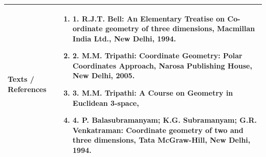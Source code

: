 \documentclass[11pt,a4paper]{article}
\begin{document}
\vspace{8pt}
\renewcommand{\arraystretch}{1.3}
\begin{tabularx}{\textwidth}{|p{3.2cm}|X|}
\hline
\textbf{Texts / References} & \begin{enumerate}[leftmargin=*,noitemsep,topsep=2pt]  \item 1. R.J.T. Bell: An Elementary Treatise on Co-ordinate geometry of three dimensions, Macmillan  India Ltd., New Delhi, 1994.  \item 2. M.M. Tripathi: Coordinate Geometry: Polar Coordinates Approach, Narosa Publishing House,  New Delhi, 2005.  \item 3. M.M. Tripathi: A Course on Geometry in Euclidean 3-space,  \item 4. P. Balasubramanyam; K.G. Subramanyam; G.R. Venkatraman: Coordinate geometry  of two  and three dimensions, Tata McGraw-Hill, New Delhi, 1994.\end{enumerate} \\
\hline
\end{tabularx}
\clearpage
\end{document}

